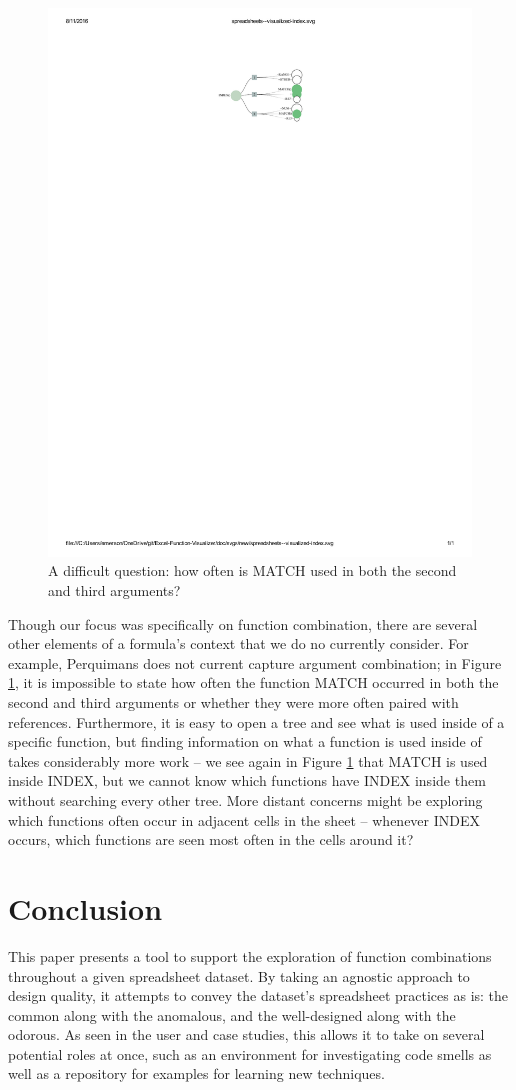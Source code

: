 \documentclass[conference]{IEEEtran}
\newcommand{\toolname}{Perquimans } \newcommand{\toolnameend}{Perquimans}
\begin{document}
	\begin{figure} \centering \includegraphics[width=.4\textwidth]{index}
		\caption{A difficult question: how often is MATCH used in both the second and
			third arguments?} \label{fig:index} \end{figure}
	
	Though our focus was specifically on function combination, there are several
	other elements of a formula's context that we do no currently consider. For
	example, \toolname does not current capture argument combination; in Figure
	\ref{fig:index}, it is impossible to state how often the function MATCH
	occurred in both the second and third arguments or whether they were more often
	paired with references. Furthermore, it is easy to open a tree and see what is
	used inside of a specific function, but finding information on what a function
	is used inside of takes considerably more work -- we see again in Figure
	\ref{fig:index} that MATCH is used inside INDEX, but we cannot know which
	functions have INDEX inside them without searching every other tree. More
	distant concerns might be exploring which functions often occur in adjacent
	cells in the sheet -- whenever INDEX occurs, which functions are seen most
	often in the cells around it?
	
	\section{Conclusion}
	
	This paper presents a tool to support the exploration of function combinations
	throughout a given spreadsheet dataset. By taking an agnostic approach to
	design quality, it attempts to convey the dataset's spreadsheet practices as
	is: the common along with the anomalous, and the well-designed along with the
	odorous. As seen in the user and case studies, this allows it to take on
	several potential roles at once, such as an environment for investigating code
	smells as well as a repository for examples for learning new techniques. \par
	
\end{document}
